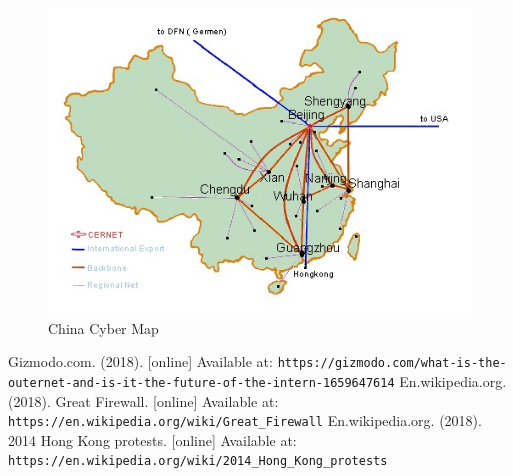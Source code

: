 \documentclass[10pt,conference,a4paper]{IEEEtran}%
\begin{document}
\begin{figure}[htb]
	\centering
		\includegraphics[width=\columnwidth]{images/cyber_map}
		\caption{China Cyber Map}
	\label{fig:graph}
\end{figure}

\begin{thebibliography}{2}
   Gizmodo.com. (2018). [online] Available at: \texttt{https://gizmodo.com/what-is-the-outernet-and-is-it-the-future-of-the-intern-1659647614}
   En.wikipedia.org. (2018). Great Firewall. [online] Available at: \texttt{https://en.wikipedia.org/wiki/Great\_Firewall}
   En.wikipedia.org. (2018). 2014 Hong Kong protests. [online] Available at: \texttt{https://en.wikipedia.org/wiki/2014\_Hong\_Kong\_protests}
\end{thebibliography}
\end{document}
